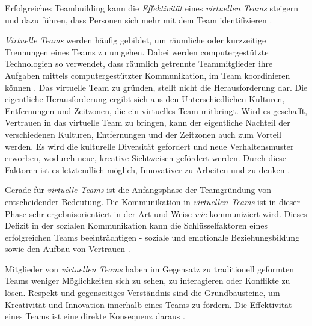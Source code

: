 \documentclass[a4paper,11pt]{article}%
\renewcommand{\\}{\vspace*{0.5\baselineskip} \newline}
\begin{document}
Erfolgreiches Teambuilding kann die \textit{Effektivität} eines \textit{virtuellen Teams} steigern und dazu führen, dass Personen sich mehr mit dem Team identifizieren \citep{kaiser2000student}.

\textit{Virtuelle Teams} werden häufig gebildet, um räumliche oder kurzzeitige Trennungen eines Teams zu umgehen. Dabei werden computergestützte Technologien so verwendet, dass räumlich getrennte Teammitglieder ihre Aufgaben mittels computergestützter Kommunikation, im Team koordinieren können \citep[S. 117-119]{peters2007identifying} \citep[S. 1-2]{cascio2003leadership}.
Das virtuelle Team zu gründen, stellt nicht die Herausforderung dar. Die eigentliche Herausforderung ergibt sich aus den Unterschiedlichen Kulturen, Entfernungen und Zeitzonen, die ein virtuelles Team mitbringt. Wird es geschafft, Vertrauen in das virtuelle Team zu bringen, kann der eigentliche Nachteil der verschiedenen Kulturen, Entfernungen und der Zeitzonen auch zum Vorteil werden. Es wird die kulturelle Diversität gefordert und neue Verhaltensmuster erworben, wodurch neue, kreative Sichtweisen gefördert werden. Durch diese Faktoren ist es letztendlich möglich, Innovativer zu Arbeiten und zu denken \citep{dyer1995team} \citep[S.405-416]{milliken1996searching}.


Gerade für \textit{virtuelle Teams} ist die Anfangsphase der Teamgründung von entscheidender Bedeutung. 
Die Kommunikation in \textit{virtuellen Teams} ist in dieser Phase sehr ergebnisorientiert in der Art und Weise \textit{wie} kommuniziert wird. Dieses Defizit in der sozialen Kommunikation kann die Schlüsselfaktoren eines erfolgreichen Teams beeinträchtigen - soziale und emotionale Beziehungsbildung sowie den Aufbau von Vertrauen \citep[S.378]{ren2007applying}.

Mitglieder von \textit{virtuellen Teams} haben im Gegensatz zu traditionell geformten Teams weniger Möglichkeiten sich zu sehen, zu interagieren oder Konflikte zu lösen. 
Respekt und gegenseitiges Verständnis sind die Grundbausteine, um Kreativität und Innovation innerhalb eines Teams zu fördern. Die Effektivität eines Teams ist eine direkte Konsequenz daraus \citep[S.378]{ren2007applying}.
\end{document}
